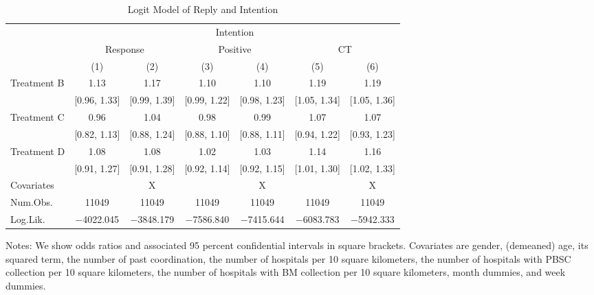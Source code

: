 \documentclass[12pt, a4paper]{article}
\begin{document}
\begin{table}[H]

\caption{\label{tab:stock-logit}Logit Model of Reply and Intention}
\centering
\fontsize{9}{11}\selectfont
\begin{threeparttable}
\begin{tabular}[t]{lcccccc}
\toprule
\multicolumn{3}{c}{ } & \multicolumn{2}{c}{Intention} & \multicolumn{2}{c}{ } \\
\cmidrule(l{3pt}r{3pt}){4-5}
\multicolumn{1}{c}{ } & \multicolumn{2}{c}{Response} & \multicolumn{2}{c}{Positive} & \multicolumn{2}{c}{CT} \\
\cmidrule(l{3pt}r{3pt}){2-3} \cmidrule(l{3pt}r{3pt}){4-5} \cmidrule(l{3pt}r{3pt}){6-7}
  & (1) & (2) & (3) & (4) & (5) & (6)\\
\midrule
Treatment B & \num{1.13} & \num{1.17} & \num{1.10} & \num{1.10} & \num{1.19} & \num{1.19}\\
 & {}[\num{0.96}, \num{1.33}] & {}[\num{0.99}, \num{1.39}] & {}[\num{0.99}, \num{1.22}] & {}[\num{0.98}, \num{1.23}] & {}[\num{1.05}, \num{1.34}] & {}[\num{1.05}, \num{1.36}]\\
Treatment C & \num{0.96} & \num{1.04} & \num{0.98} & \num{0.99} & \num{1.07} & \num{1.07}\\
 & {}[\num{0.82}, \num{1.13}] & {}[\num{0.88}, \num{1.24}] & {}[\num{0.88}, \num{1.10}] & {}[\num{0.88}, \num{1.11}] & {}[\num{0.94}, \num{1.22}] & {}[\num{0.93}, \num{1.23}]\\
Treatment D & \num{1.08} & \num{1.08} & \num{1.02} & \num{1.03} & \num{1.14} & \num{1.16}\\
 & {}[\num{0.91}, \num{1.27}] & {}[\num{0.91}, \num{1.28}] & {}[\num{0.92}, \num{1.14}] & {}[\num{0.92}, \num{1.15}] & {}[\num{1.01}, \num{1.30}] & {}[\num{1.02}, \num{1.33}]\\
\midrule
Covariates &  & X &  & X &  & X\\
Num.Obs. & \num{11049} & \num{11049} & \num{11049} & \num{11049} & \num{11049} & \num{11049}\\
Log.Lik. & \num{-4022.045} & \num{-3848.179} & \num{-7586.840} & \num{-7415.644} & \num{-6083.783} & \num{-5942.333}\\
\bottomrule
\end{tabular}
\begin{tablenotes}
\item Notes: We show odds ratios and associated 95 percent confidential intervals in square brackets. Covariates are gender, (demeaned) age, its squared term, the number of past coordination, the number of hospitals per 10 square kilometers, the number of hospitals with PBSC collection per 10 square kilometers, the number of hospitals with BM collection per 10 square kilometers, month dummies, and week dummies.
\end{tablenotes}
\end{threeparttable}
\end{table}
\end{document}
